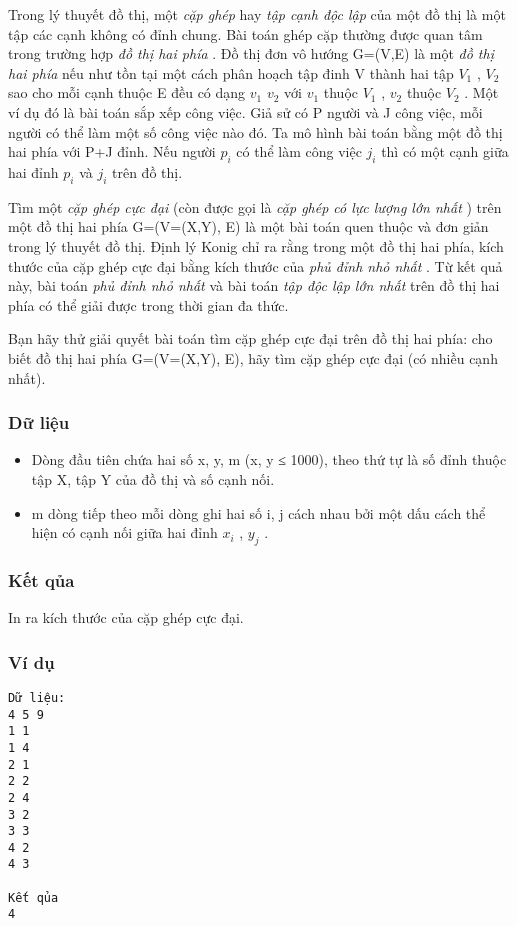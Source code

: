 



   Trong lý thuyết đồ thị, một   \textit{    cặp ghép   }   hay   \textit{    tập cạnh độc lập   }   của một đồ thị là một tập các cạnh không có đỉnh chung. Bài toán ghép   cặp thường được quan tâm trong trường hợp   \textit{    đồ thị hai phía   }   . Đồ thị đơn vô hướng G=(V,E) là một   \textit{    đồ thị hai phía   }   nếu như tồn tại một   cách phân hoạch tập đinh V thành hai tập $V_{1}$   , $V_{2}$   sao cho mỗi cạnh thuộc E đều có dạng $v_{1}$   $v_{2}$   với $v_{1}$   thuộc $V_{1}$   , $v_{2}$   thuộc $V_{2}$   . Một ví dụ đó là bài toán sắp xếp công việc. Giả sử có P người và   J công việc, mỗi người có thể làm một số công việc nào đó. Ta mô hình bài toán bằng một đồ thị hai phía với P+J đỉnh. Nếu người $p_{i}$   có   thể làm công việc $j_{i}$   thì có một cạnh giữa hai đỉnh $p_{i}$   và $j_{i}$   trên đồ thị.  

   Tìm một   \textit{    cặp ghép cực đại   }   (còn được gọi là   \textit{    cặp ghép có lực lượng lớn nhất   }   ) trên một đồ thị hai phía G=(V=(X,Y), E) là một bài   toán quen thuộc và đơn giản trong lý thuyết đồ thị. Định lý Konig chỉ ra rằng trong một đồ thị hai phía, kích thước của cặp ghép cực đại bằng kích thước   của   \textit{    phủ đỉnh nhỏ nhất   }   . Từ kết quả này, bài toán   \textit{    phủ đỉnh nhỏ nhất   }   và bài toán   \textit{    tập độc lập lớn nhất   }   trên đồ thị hai phía có thể giải   được trong thời gian đa thức.  

   Bạn hãy thử giải quyết bài toán tìm cặp ghép cực đại trên đồ thị hai phía: cho biết đồ thị hai phía G=(V=(X,Y), E), hãy tìm cặp ghép cực đại (có   nhiều cạnh nhất).  

\subsubsection{   Dữ liệu  }
\begin{itemize}
	\item     Dòng đầu tiên chứa hai số x, y, m  (x, y ≤ 1000), theo thứ tự là số đỉnh thuộc tập X, tập Y của đồ thị và số cạnh nối.   
	\item     m dòng tiếp theo mỗi dòng ghi hai số i, j cách nhau bởi một dấu cách thể hiện có cạnh nối giữa hai đỉnh $x_{i}$    , $y_{j}$    .   
\end{itemize}

\subsubsection{   Kết qủa  }

   In ra kích thước của cặp ghép cực đại.  

\subsubsection{   Ví dụ  }
\begin{verbatim}
Dữ liệu:
4 5 9
1 1
1 4
2 1
2 2
2 4
3 2
3 3
4 2
4 3

Kết qủa
4
\end{verbatim}
